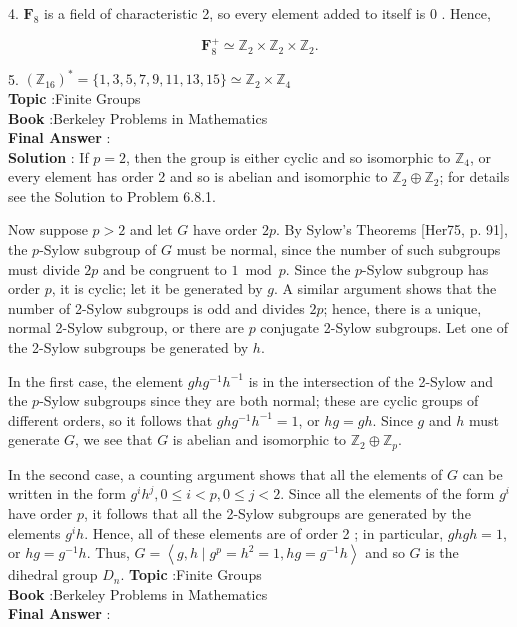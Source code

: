 \documentclass[10pt]{article}
\begin{document}
4. $\mathbf{F}_{8}$ is a field of characteristic 2, so every element added to itself is 0 . Hence,

$$
\mathbf{F}_{8}^{+} \simeq \mathbb{Z}_{2} \times \mathbb{Z}_{2} \times \mathbb{Z}_{2} .
$$

5. $\left(\mathbb{Z}_{16}\right)^{*}=\{1,3,5,7,9,11,13,15\} \simeq \mathbb{Z}_{2} \times \mathbb{Z}_{4}$ \\
\textbf{Topic} :Finite Groups \\
\textbf{Book} :Berkeley Problems in Mathematics\\
\textbf{Final Answer} :\\


\textbf{Solution} : If $p=2$, then the group is either cyclic and so isomorphic to $\mathbb{Z}_{4}$, or every element has order 2 and so is abelian and isomorphic to $\mathbb{Z}_{2} \oplus \mathbb{Z}_{2}$; for details see the Solution to Problem 6.8.1.

Now suppose $p>2$ and let $G$ have order $2 p$. By Sylow's Theorems [Her75, p. 91], the $p$-Sylow subgroup of $G$ must be normal, since the number of such subgroups must divide $2 p$ and be congruent to $1 \bmod p$. Since the $p$-Sylow subgroup has order $p$, it is cyclic; let it be generated by $g$. A similar argument shows that the number of 2-Sylow subgroups is odd and divides $2 p$; hence, there is a unique, normal 2-Sylow subgroup, or there are $p$ conjugate 2-Sylow subgroups. Let one of the 2-Sylow subgroups be generated by $h$.

In the first case, the element $g h g^{-1} h^{-1}$ is in the intersection of the 2-Sylow and the $p$-Sylow subgroups since they are both normal; these are cyclic groups of different orders, so it follows that $g h g^{-1} h^{-1}=1$, or $h g=g h$. Since $g$ and $h$ must generate $G$, we see that $G$ is abelian and isomorphic to $\mathbb{Z}_{2} \oplus \mathbb{Z}_{p}$.

In the second case, a counting argument shows that all the elements of $G$ can be written in the form $g^{i} h^{j}, 0 \leqslant i<p, 0 \leqslant j<2$. Since all the elements of the form $g^{i}$ have order $p$, it follows that all the 2-Sylow subgroups are generated by the elements $g^{i} h$. Hence, all of these elements are of order 2 ; in particular, $g h g h=1$, or $h g=g^{-1} h$. Thus, $G=\left\langle g, h \mid g^{p}=h^{2}=1, h g=g^{-1} h\right\rangle$ and so $G$ is the dihedral group $D_{n}$.
\textbf{Topic} :Finite Groups \\
\textbf{Book} :Berkeley Problems in Mathematics\\
\textbf{Final Answer} :\\
\end{document}
